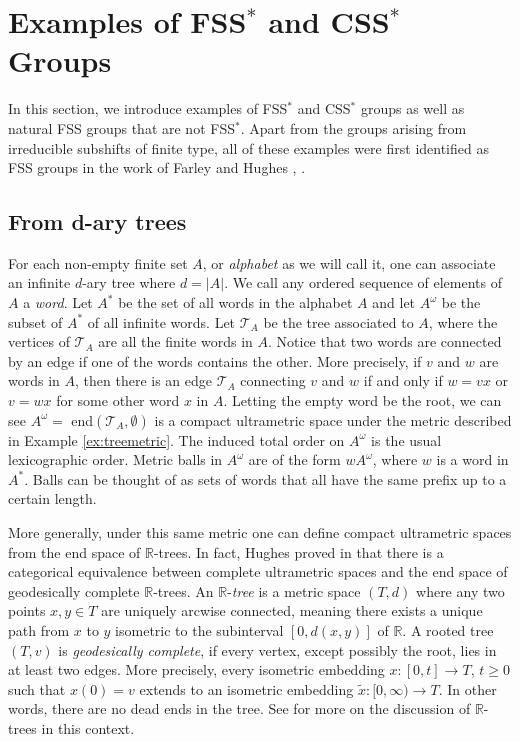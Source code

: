 \documentclass[12pt]{amsart}
\numberwithin{equation}{subsection}
\theoremstyle{definition}
\theoremstyle{definition}
\theoremstyle{remark}
\begin{document}
\section{Examples of \texorpdfstring{FSS$^*$}{FSS*} and \texorpdfstring{CSS$^*$}{CSS*} Groups}\label{sec:examples}

In this section, we introduce examples of FSS$^*$ and CSS$^*$ groups as well as natural FSS groups that are not FSS$^*$. Apart from the groups arising from irreducible subshifts of finite type, all of these examples were first identified as FSS groups in the work of Farley and Hughes \cite{hughes2009}, \cite{hughes2017braided}. 



\subsection{From d-ary trees}

For each non-empty finite set $A$, or \textit{alphabet} as we will call it, one can associate an infinite $d$-ary tree where $d = \vert A \vert$. We call any ordered sequence of elements of $A$ a \textit{word}. Let $A^*$ be the set of all words in the alphabet $A$ and let $A^\omega$ be the subset of $A^*$ of all infinite words. Let $\mathcal T_A$ be the tree associated to $A$, where the vertices of $\mathcal T_A$ are all the finite words in $A$. Notice that two words are connected by an edge if one of the words contains the other. More precisely, if $v$ and $w$ are words in $A$, then there is an edge $\mathcal T_A$ connecting $v$ and $w$ if and only if $w=vx$ or $v=wx$ for some other word $x$ in $A$. Letting the empty word be the root, we can see $A^\omega =$ end$(\mathcal T_A, \emptyset)$ is a compact ultrametric space under the metric described in Example \ref{ex:treemetric}. The induced total order on $A^\omega$ is the usual lexicographic order. 
Metric balls in $A^\omega$ are of the form $wA^\omega$, where $w$ is a word in $A^*$. Balls can be thought of as sets of words that all have the same prefix up to a certain length. 

More generally, under this same metric one can define compact ultrametric spaces from the end space of $\mathbb R$-trees. In
fact, Hughes proved in \cite{hughes2004treescategorical} that there is a categorical equivalence between complete ultrametric spaces and the end
space of geodesically complete $\mathbb R$-trees. An $\mathbb R$-\textit{tree} is a metric space $(T,d)$ where any two points $x,y \in T$ are uniquely arcwise connected, meaning there exists a unique path from $x$ to $y$ isometric to the subinterval $[0,d(x,y)]$ of $\mathbb R$. A rooted tree $(T,v)$ is \textit{geodesically complete}, if every vertex, except possibly the root, lies in at least two edges. More precisely, every isometric embedding $x:[0,t] \rightarrow T$, $t \geq0$ such that $x(0)=v$ extends to an isometric embedding $\tilde x:[0,\infty) \rightarrow T$. In other words, there are no dead ends in the tree. See \cite[Section 5]{hughes2012treesnoncomm} for more on the discussion of $\mathbb R$-trees in this context. 
\end{document}
